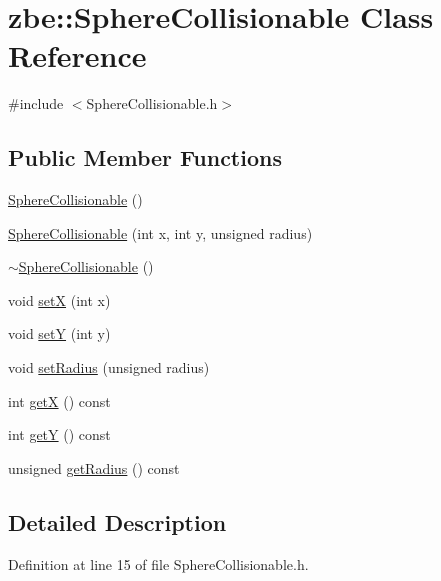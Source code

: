 \hypertarget{classzbe_1_1_sphere_collisionable}{}\section{zbe\+:\+:Sphere\+Collisionable Class Reference}
\label{classzbe_1_1_sphere_collisionable}


{\ttfamily \#include $<$Sphere\+Collisionable.\+h$>$}

\subsection*{Public Member Functions}
\begin{DoxyCompactItemize}
\item 
\hyperlink{classzbe_1_1_sphere_collisionable_ac6104df39ed6b19643e336f01162f027}{Sphere\+Collisionable} ()
\item 
\hyperlink{classzbe_1_1_sphere_collisionable_a205d1c610acd836dc53b70902178a132}{Sphere\+Collisionable} (int x, int y, unsigned radius)
\item 
\hyperlink{classzbe_1_1_sphere_collisionable_acc7ff679ae8ffe1d597f9c621015c4cb}{$\sim$\+Sphere\+Collisionable} ()
\item 
void \hyperlink{classzbe_1_1_sphere_collisionable_ae4cb4df9c8406391dd36e7ca87fb0199}{set\+X} (int x)
\item 
void \hyperlink{classzbe_1_1_sphere_collisionable_add3a91da7f4d20e604a963570015189f}{set\+Y} (int y)
\item 
void \hyperlink{classzbe_1_1_sphere_collisionable_a1ba139746e5b18814d7b00cf0221b757}{set\+Radius} (unsigned radius)
\item 
int \hyperlink{classzbe_1_1_sphere_collisionable_a44e70ae23d8bb1dd6d27b7b329f700ac}{get\+X} () const 
\item 
int \hyperlink{classzbe_1_1_sphere_collisionable_a6e3fde0b9d686f49564cee9ef8aceef4}{get\+Y} () const 
\item 
unsigned \hyperlink{classzbe_1_1_sphere_collisionable_a5ed9a7f7a29ddf7175955da06b145c2c}{get\+Radius} () const 
\end{DoxyCompactItemize}


\subsection{Detailed Description}


Definition at line 15 of file Sphere\+Collisionable.\+h.



